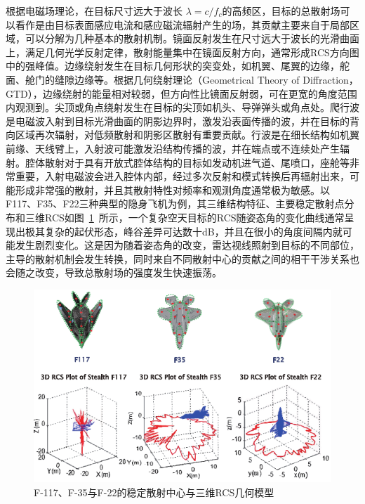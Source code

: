 根据电磁场理论，在目标尺寸远大于波长 $\lambda = c/f_c$的高频区，目标的总散射场可以看作是由目标表面感应电流和感应磁流辐射产生的场，其贡献主要来自于局部区域，可以分解为几种基本的散射机制。镜面反射发生在尺寸远大于波长的光滑曲面上，满足几何光学反射定律，散射能量集中在镜面反射方向，通常形成RCS方向图中的强峰值。边缘绕射发生在目标几何形状的突变处，如机翼、尾翼的边缘，舵面、舱门的缝隙边缘等。根据几何绕射理论（Geometrical Theory of Diffraction，GTD），边缘绕射的能量相对较弱，但方向性比镜面反射弱，可在更宽的角度范围内观测到。尖顶或角点绕射发生在目标的尖顶如机头、导弹弹头或角点处。爬行波是电磁波入射到目标光滑曲面的阴影边界时，激发沿表面传播的波，并在目标的背向区域再次辐射，对低频散射和阴影区散射有重要贡献。行波是在细长结构如机翼前缘、天线臂上，入射波可能激发沿结构传播的波，并在端点或不连续处产生辐射。腔体散射对于具有开放式腔体结构的目标如发动机进气道、尾喷口，座舱等非常重要，入射电磁波会进入腔体内部，经过多次反射和模式转换后再辐射出来，可能形成非常强的散射，并且其散射特性对频率和观测角度通常极为敏感。以F117、F35、F22三种典型的隐身飞机为例，其三维结构特征、主要稳定散射点分布和三维RCS如图~\ref{fig:rcs}~所示，一个复杂空天目标的RCS随姿态角的变化曲线通常呈现出极其复杂的起伏形态，峰谷差异可达数十dB，并且在很小的角度间隔内就可能发生剧烈变化。这是因为随着姿态角的改变，雷达视线照射到目标的不同部位，主导的散射机制会发生转换，同时来自不同散射中心的贡献之间的相干干涉关系也会随之改变，导致总散射场的强度发生快速振荡。

\begin{figure}[h]
    \centering
    \includegraphics[width=0.9\linewidth]{figures/rcs.pdf}
    \caption{F-117、F-35与F-22的稳定散射中心与三维RCS几何模型}
    \label{fig:rcs}
\end{figure}

